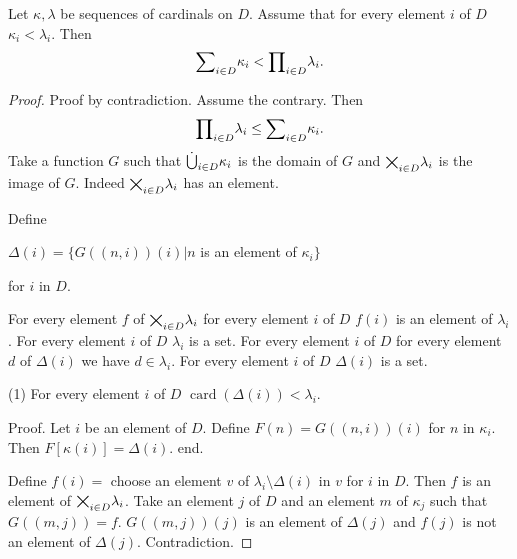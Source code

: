 \documentclass{article}
\newcommand{\card}[1]{\operatorname{card}(#1)}
\begin{document}
\begin{forthel}
    \begin{theorem}
      Let $\kappa, \lambda$ be sequences of cardinals on $D$.
     Assume that for every element $i$ of $D$
     $\kappa_{i} < \lambda_{i}$.
     Then $${\sum}_{i \in D} \kappa_{i} < {\prod}_{i \in D} \lambda_{i}.$$
    \end{theorem}
    \begin{proof}
      Proof by contradiction. Assume the contrary.
      Then $${\prod}_{i \in D} \lambda_{i} \leq {\sum}_{i \in D} \kappa_{i}.$$
      Take a function $G$ such that ${\dot{\bigcup}}_{i \in D} \kappa_{i}$ is the domain of $G$
      and ${\bigtimes}_{i \in D} \lambda_{i}$ is the image of $G$.
      Indeed ${\bigtimes}_{i \in D} \lambda_{i}$ has an element.

      Define

      $\Delta(i) =
     \{G((n,i))(i) | n$ is an element of $\kappa_{i}\}$

      for $i$ in $D$.

      For every element $f$ of ${\bigtimes}_{i \in D} \lambda_{i}$
      for every element $i$ of $D$
      $f(i)$ is an element of $\lambda_{i}$.
      For every element $i$ of $D$ $\lambda_{i}$ is a set.
      For every element $i$ of $D$ for every element $d$ of $\Delta(i)$
      we have $d\in \lambda_{i}$.
      For every element $i$ of $D$ $\Delta(i)$ is a set.

     (1) For every element $i$ of $D$
      $\card{\Delta(i)} < \lambda_{i}$.

      Proof.
        Let $i$ be an element of $D$.
        Define $F(n) = G((n,i))(i)$ for $n$ in $\kappa_{i}$.
        Then $F[\kappa(i)] = \Delta(i)$.
      end.

      Define
      $f(i) =$ choose an element $v$ of
      $\lambda_{i} \setminus \Delta(i)$ in
      $v$ for $i$ in $D$. Then $f$ is an element of
      ${\bigtimes}_{i \in D} \lambda_{i}$. Take an element $j$ of $D$ and an
      element $m$ of $\kappa_{j}$ such that $G((m,j)) = f$.
      $G((m,j))(j)$ is an element of $\Delta(j)$ and $f(j)$
      is not an element of $\Delta(j)$. Contradiction.
    \end{proof}
  \end{forthel}
\end{document}
